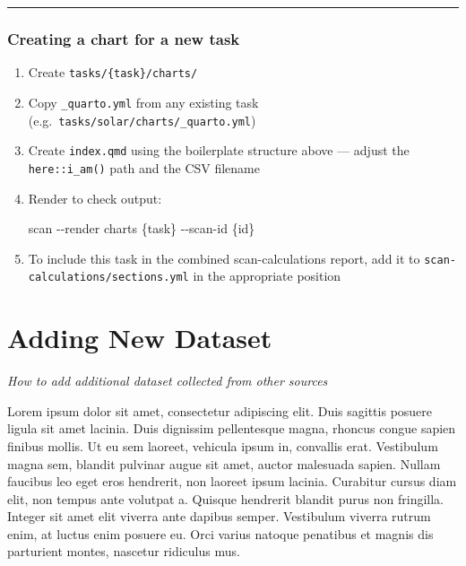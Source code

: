 \documentclass[
  letterpaper,
  DIV=11,
  numbers=noendperiod]{scrreprt}
\newenvironment{Shaded}{\begin{snugshade}}{\end{snugshade}}
\newcommand{\AttributeTok}[1]{\textcolor[rgb]{0.40,0.45,0.13}{#1}}
\newcommand{\ExtensionTok}[1]{\textcolor[rgb]{0.00,0.23,0.31}{#1}}
\newcommand{\NormalTok}[1]{\textcolor[rgb]{0.00,0.23,0.31}{#1}}
\begin{document}
\begin{center}\rule{0.5\linewidth}{0.5pt}\end{center}

\subsection{Creating a chart for a new
task}\label{creating-a-chart-for-a-new-task}

\begin{enumerate}
\def\labelenumi{\arabic{enumi}.}
\item
  Create \texttt{tasks/\{task\}/charts/}
\item
  Copy \texttt{\_quarto.yml} from any existing task
  (e.g.~\texttt{tasks/solar/charts/\_quarto.yml})
\item
  Create \texttt{index.qmd} using the boilerplate structure above ---
  adjust the \texttt{here::i\_am()} path and the CSV filename
\item
  Render to check output:

\begin{Shaded}
\begin{Highlighting}[]
\ExtensionTok{scan} \AttributeTok{{-}{-}render}\NormalTok{ charts \{task\} }\AttributeTok{{-}{-}scan{-}id}\NormalTok{ \{id\}}
\end{Highlighting}
\end{Shaded}
\item
  To include this task in the combined scan-calculations report, add it
  to \texttt{scan-calculations/sections.yml} in the appropriate position
\end{enumerate}

\chapter{Adding New Dataset}\label{adding-new-dataset}

\emph{How to add additional dataset collected from other sources}

Lorem ipsum dolor sit amet, consectetur adipiscing elit. Duis sagittis
posuere ligula sit amet lacinia. Duis dignissim pellentesque magna,
rhoncus congue sapien finibus mollis. Ut eu sem laoreet, vehicula ipsum
in, convallis erat. Vestibulum magna sem, blandit pulvinar augue sit
amet, auctor malesuada sapien. Nullam faucibus leo eget eros hendrerit,
non laoreet ipsum lacinia. Curabitur cursus diam elit, non tempus ante
volutpat a. Quisque hendrerit blandit purus non fringilla. Integer sit
amet elit viverra ante dapibus semper. Vestibulum viverra rutrum enim,
at luctus enim posuere eu. Orci varius natoque penatibus et magnis dis
parturient montes, nascetur ridiculus mus.
\end{document}
